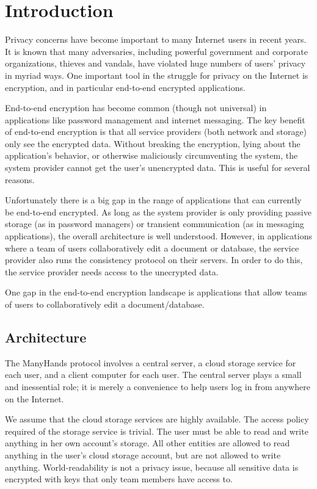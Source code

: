 \documentclass[pldi,10pt,preprint]{sigplanconf-pldi16}
\begin{document}
\section{Introduction}

Privacy concerns have become important to many Internet users in recent years.
It is known that many adversaries, including powerful government and corporate organizations, thieves and vandals, have violated huge numbers of users' privacy in myriad ways.
One important tool in the struggle for privacy on the Internet is encryption, and in particular end-to-end encrypted applications.

End-to-end encryption has become common (though not universal) in applications like password management and internet messaging.
The key benefit of end-to-end encryption is that all service providers (both network and storage) only see the encrypted data.
Without breaking the encryption, lying about the application's behavior, or otherwise maliciously circumventing the system, the system provider cannot get the user's unencrypted data.
This is useful for several reasons.

Unfortunately there is a big gap in the range of applications that can currently be end-to-end encrypted.
As long as the system provider is only providing passive storage (as in password managers) or transient communication (as in messaging applications), the overall architecture is well understood.
However, in applications where a team of users collaboratively edit a document or database, the service provider also runs the consistency protocol on their servers.
In order to do this, the service provider needs access to the unecrypted data.

One gap in the end-to-end encryption landscape is applications that allow teams of users to collaboratively edit a document/database.

\subsection{Architecture}

The ManyHands protocol involves a central server, a cloud storage service for each user, and a client computer for each user.
The central server plays a small and inessential role; it is merely a convenience to help users log in from anywhere on the Internet.

We assume that the cloud storage services are highly available.
The access policy required of the storage service is trivial.
The user must be able to read and write anything in her own account's storage.
All other entities are allowed to read anything in the user's cloud storage account, but are not allowed to write anything.
World-readability is not a privacy issue, because all sensitive data is encrypted with keys that only team members have access to.
\end{document}
